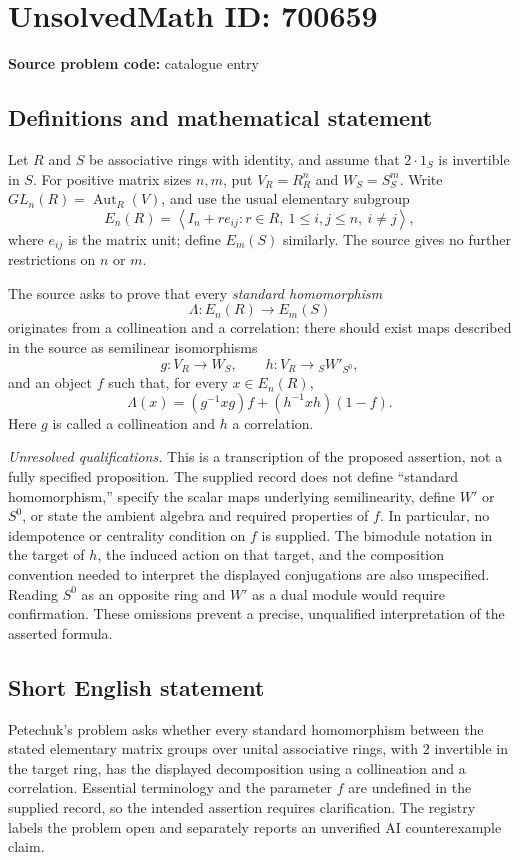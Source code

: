 \documentclass[11pt]{article}
\begin{document}
\section*{UnsolvedMath ID: 700659}
\textbf{Source problem code:} catalogue entry
\subsection{Definitions and mathematical statement}
Let \(R\) and \(S\) be associative rings with identity, and assume that \(2\cdot 1_S\) is invertible in \(S\). For positive matrix sizes \(n,m\), put \(V_R=R^n_R\) and \(W_S=S^m_S\). Write \(GL_n(R)=\operatorname{Aut}_R(V)\), and use the usual elementary subgroup
\[
E_n(R)=\left\langle I_n+r e_{ij}:r\in R,\ 1\leq i,j\leq n,\ i\neq j\right\rangle,
\]
where \(e_{ij}\) is the matrix unit; define \(E_m(S)\) similarly. The source gives no further restrictions on \(n\) or \(m\).

The source asks to prove that every \emph{standard homomorphism}
\[
\Lambda:E_n(R)\longrightarrow E_m(S)
\]
originates from a collineation and a correlation: there should exist maps described in the source as semilinear isomorphisms
\[
g:V_R\longrightarrow W_S,
\qquad
h:V_R\longrightarrow {}_S\!W'_{S^0},
\]
and an object \(f\) such that, for every \(x\in E_n(R)\),
\[
\Lambda(x)=(g^{-1}xg)f+(h^{-1}xh)(1-f).
\]
Here \(g\) is called a collineation and \(h\) a correlation.

\textit{Unresolved qualifications.} This is a transcription of the proposed assertion, not a fully specified proposition. The supplied record does not define ``standard homomorphism,'' specify the scalar maps underlying semilinearity, define \(W'\) or \(S^0\), or state the ambient algebra and required properties of \(f\). In particular, no idempotence or centrality condition on \(f\) is supplied. The bimodule notation in the target of \(h\), the induced action on that target, and the composition convention needed to interpret the displayed conjugations are also unspecified. Reading \(S^0\) as an opposite ring and \(W'\) as a dual module would require confirmation. These omissions prevent a precise, unqualified interpretation of the asserted formula.
\subsection{Short English statement}
Petechuk's problem asks whether every standard homomorphism between the stated elementary matrix groups over unital associative rings, with \(2\) invertible in the target ring, has the displayed decomposition using a collineation and a correlation. Essential terminology and the parameter \(f\) are undefined in the supplied record, so the intended assertion requires clarification. The registry labels the problem open and separately reports an unverified AI counterexample claim.
\end{document}
